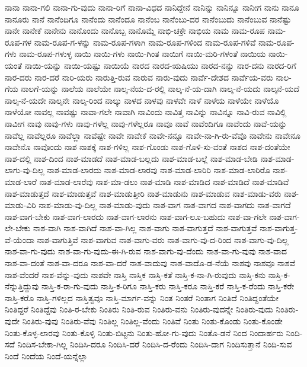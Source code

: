 {ನಾನಾ
ನಾನಾ-ಗಲಿ
ನಾನಾ-ಗು-ವುದು
ನಾನಾ-ರಿಗೆ
ನಾನಾ-ವಿಧದ
ನಾನಿದ್ದೇನೆ
ನಾನಿನ್ನು
ನಾನಿನ್ನೂ
ನಾನೀಗ
ನಾನು
ನಾನೂ
ನಾನೂರು
ನಾನೆ
ನಾನೆಂದಿಗೂ
ನಾನೆಂದು
ನಾನೆಂದೂ
ನಾನೆಂಬ
ನಾನೆಂಬು-ದರ
ನಾನೆಂಬುದು
ನಾನೆಂಬುವ
ನಾನೆಷ್ಟು
ನಾನೇ
ನಾನೇಕೆ
ನಾನೇನು
ನಾನೊಂದು
ನಾನೊಬ್ಬ
ನಾನೊಮ್ಮೆ
ನಾಭಿ-ಚಕ್ರೇ
ನಾಭಿಯ
ನಾಮ
ನಾಮ-ರೂಪ
ನಾಮ-ರೂಪ-ಗಳ
ನಾಮ-ರೂಪ-ಗ-ಳನ್ನು
ನಾಮ-ರೂಪ-ಗಳಾಗಿ
ನಾಮ-ರೂಪ-ಗಳಿಂದ
ನಾಮ-ರೂಪ-ಗಳಿವೆ
ನಾಮ-ರೂಪ-ಗಳು
ನಾಮ-ರೂಪ-ಗಳುಳ್ಳ
ನಾಯಿ
ನಾಯಿ-ಗಳು
ನಾಯಿ-ಗಿಂತ
ನಾಯಿಗೆ
ನಾಯಿ-ಮರಿ-ಗಳಂತೆ
ನಾಯಿಯ
ನಾಯಿ-ಯಂತೆ
ನಾಯಿ-ಯನ್ನು
ನಾಯಿ-ಯಷ್ಟು
ನಾಯಿಯೆ
ನಾರದ
ನಾರದ-ಋಷಿಯು
ನಾರದ-ನನ್ನು
ನಾರ-ದನು
ನಾರದ-ರಿಗೆ
ನಾರ-ದರು
ನಾರ-ದರೆ
ನಾರಿ-ಯರು
ನಾರುತ್ತಿ-ರುವ
ನಾರುವ
ನಾರು-ವುದು
ನಾರ್ವೆ-ದೇಶದ
ನಾರ್ವೆಯ-ವರು
ನಾಲ-ಗೆಯ
ನಾಲಗೆ-ಯನ್ನು
ನಾಲೆಯ
ನಾಲೆಯೇ
ನಾಲ್ಕ-ನೆಯ-ದ-ರಲ್ಲಿ
ನಾಲ್ಕ-ನೆ-ಯ-ದಾಗಿ
ನಾಲ್ಕ-ನೆ-ಯದು
ನಾಲ್ಕನೆ-ಯದೆ
ನಾಲ್ಕ-ನೆ-ಯದೇ
ನಾಲ್ಕನೇ
ನಾಲ್ಕ-ರಿಂದ
ನಾಲ್ಕು
ನಾಳದ
ನಾಳವು
ನಾಳವೇ
ನಾಳೆ
ನಾಳೆಯ
ನಾಳೆಯೇ
ನಾಳೆಯೊ
ನಾಳೆಯೋ
ನಾವಲ್ಲ
ನಾವಷ್ಟು
ನಾವಾ-ಗಲೇ
ನಾವಾಗಿ
ನಾವಿಂದು
ನಾವಿತ್ತ
ನಾವಿನ್ನು
ನಾವಿನ್ನೂ
ನಾವಿ-ರುವ
ನಾವಿಲ್ಲಿ
ನಾವೀಗ
ನಾವು
ನಾವು-ಗಳು
ನಾವು-ಗಳೆಲ್ಲ
ನಾವು-ಗಳೆಲ್ಲರೂ
ನಾವೂ
ನಾವೆ
ನಾವೆಂದಿಗೂ
ನಾವೆಂದು
ನಾವೆ-ಯನ್ನು
ನಾವೆಲ್ಲ
ನಾವೆಲ್ಲರೂ
ನಾವೆಲ್ಲಾ
ನಾವೆಷ್ಟೇ
ನಾವೇ
ನಾವೇಕೆ
ನಾವೇ-ನನ್ನೂ
ನಾವೇ-ನಾ-ಗಿ-ರು-ವೆವೊ
ನಾವೇನು
ನಾವೇನೂ
ನಾವೇನೊ
ನಾವೊಂದು
ನಾಶ
ನಾಶಕ್ಕೆ
ನಾಶ-ಗಳಿಲ್ಲ
ನಾಶ-ಗೊಂಡು
ನಾಶ-ಗೊಳಿ-ಸು-ವಂತೆ
ನಾಶದ
ನಾಶ-ದಂತೆಯೇ
ನಾಶ-ದಲ್ಲಿ
ನಾಶ-ದಿಂದ
ನಾಶ-ಮಾಡದೆ
ನಾಶ-ಮಾಡ-ಬಲ್ಲದು
ನಾಶ-ಮಾಡ-ಬಲ್ಲೆ
ನಾಶ-ಮಾಡ-ಬೇಡಿ
ನಾಶ-ಮಾಡ-ಲಾಗು-ವು-ದಿಲ್ಲ
ನಾಶ-ಮಾಡ-ಲಾರದು
ನಾಶ-ಮಾಡ-ಲಾರವು
ನಾಶ-ಮಾಡ-ಲಾರಿರಿ
ನಾಶ-ಮಾಡ-ಲಾರಿರೊ
ನಾಶ-ಮಾಡ-ಲಾರೆ
ನಾಶ-ಮಾಡ-ಲಾರೆವು
ನಾಶ-ಮಾ-ಡಲು
ನಾಶ-ಮಾಡಿ
ನಾಶ-ಮಾಡಿದ
ನಾಶ-ಮಾಡಿದೆ
ನಾಶ-ಮಾಡಿವೆ
ನಾಶ-ಮಾಡುತ್ತದೆ
ನಾಶ-ಮಾಡುತ್ತವೆ
ನಾಶ-ಮಾಡುತ್ತೀರಿ
ನಾಶ-ಮಾಡುನು
ನಾಶ-ಮಾಡುವ
ನಾಶ-ಮಾಡು-ವರು
ನಾಶ-ಮಾಡು-ವಿರಿ
ನಾಶ-ಮಾಡು-ವು-ದಿಲ್ಲ
ನಾಶ-ಮಾಡು-ವುದು
ನಾಶ-ವಾಗ
ನಾಶ-ವಾಗದ
ನಾಶ-ವಾಗದು
ನಾಶ-ವಾಗದೆ
ನಾಶ-ವಾಗ-ಬೇಕು
ನಾಶ-ವಾಗ-ಲಾರದು
ನಾಶ-ವಾಗ-ಲಾರನು
ನಾಶ-ವಾಗ-ಲೂ-ಬಹುದು
ನಾಶ-ವಾ-ಗಲೇ
ನಾಶ-ವಾಗ-ಲೇ-ಬೇಕು
ನಾಶ-ವಾಗಿ
ನಾಶ-ವಾಗಿದೆ
ನಾಶ-ವಾ-ಗಿಲ್ಲ
ನಾಶ-ವಾಗು
ನಾಶ-ವಾಗುತ್ತದೆ
ನಾಶ-ವಾಗುತ್ತವೆ
ನಾಶ-ವಾಗುತ್ತ-ವೆ-ಯೆಂದಾ
ನಾಶ-ವಾಗುತ್ತಿವೆ
ನಾಶ-ವಾಗುವ
ನಾಶ-ವಾಗು-ವರು
ನಾಶ-ವಾಗು-ವು-ದ-ರಿಂದ
ನಾಶ-ವಾಗು-ವು-ದಿಲ್ಲ
ನಾಶ-ವಾ-ಗು-ವುದು
ನಾಶ-ವಾ-ಗು-ವುದು-ಈ-ಗಿ-ರುವ
ನಾಶ-ವಾಗು-ವು-ದೆಂದು
ನಾಶ-ವಾ-ಗು-ವುವು
ನಾಶ-ವಾದ
ನಾಶ-ವಾ-ದಂತೆ
ನಾಶ-ವಾ-ದರೂ
ನಾಶ-ವಾ-ದರೆ
ನಾಶ-ವಾದುವು
ನಾಶ-ವಾದೊ-ಡ-ನೆಯೆ
ನಾಶವು
ನಾಶವೂ
ನಾಶವೆ
ನಾಶ-ವೆಂದರೆ
ನಾಶ-ವೆನ್ನು-ವುದು
ನಾಶವೇ
ನಾಸ್ತಿ
ನಾಸ್ತಿಕ
ನಾಸ್ತಿ-ಕತೆ
ನಾಸ್ತಿ-ಕ-ನಾ-ಗಿ-ರುವುದು
ನಾಸ್ತಿ-ಕನು
ನಾಸ್ತಿ-ಕ-ನೆನ್ನುತ್ತಿದ್ದುವು
ನಾಸ್ತಿ-ಕ-ರಾ-ಗು-ವುದು
ನಾಸ್ತಿ-ಕ-ರಿಗೂ
ನಾಸ್ತಿ-ಕರು
ನಾಸ್ತಿ-ಕರೂ
ನಾಸ್ತಿ-ಕರೆ
ನಾಸ್ತಿ-ಕ-ರೆಂದು
ನಾಸ್ತಿ-ಕರೇ
ನಾಸ್ತಿ-ಕರೊ
ನಾಸ್ತಿ-ಗಳಿಲ್ಲದ
ನಾಸ್ತಿತ್ವವೂ
ನಾಸ್ತಿ-ಮಾರ್ಗ-ವನ್ನು
ನಿಂತ
ನಿಂತರೆ
ನಿಂತಾಗ
ನಿಂತಿದೆ
ನಿಂತಿದ್ದಂತೆಯೇ
ನಿಂತಿದ್ದರೆ
ನಿಂತಿದ್ದೆವು
ನಿಂತಿ-ರ-ಬೇಕು
ನಿಂತಿರು
ನಿಂತಿ-ರುವ
ನಿಂತಿರು-ವನು
ನಿಂತಿರು-ವುದನ್ನೇ
ನಿಂತಿರು-ವುದು
ನಿಂತಿರು-ವುದೇ
ನಿಂತಿರು-ವುವು
ನಿಂತಿರು-ವೆವು
ನಿಂತಿಲ್ಲ
ನಿಂತಿಲ್ಲ-ವೆಂದು
ನಿಂತಿವೆ
ನಿಂತು
ನಿಂತು-ಕೊಂಡು
ನಿಂತು-ಕೊಂಡೇ
ನಿಂತು-ಕೊಳ್ಳ-ಲಾರವು
ನಿಂತು-ಕೊಳ್ಳಿ
ನಿಂತು-ಬಿಟ್ಟನು
ನಿಂತು-ಹೋ-ಗು-ವುದು
ನಿಂತೊ-ಡನೆ
ನಿಂದ
ನಿಂದಾರ್ಹರು
ನಿಂದಿ-ಸದೆ
ನಿಂದಿಸ-ಬೇಕಾ-ಗಿಲ್ಲ
ನಿಂದಿಸಿ-ದರೂ
ನಿಂದಿಸಿ-ದರೆ
ನಿಂದಿಸಿ-ದ-ರೆಂದು
ನಿಂದಿಸಿ-ದಾಗ
ನಿಂದಿಸುತ್ತಾನೆ
ನಿಂದಿ-ಸುವ
ನಿಂದೆ
ನಿಂದೆಯ
ನಿಂದೆ-ಯನ್ನೆಲ್ಲಾ
}
